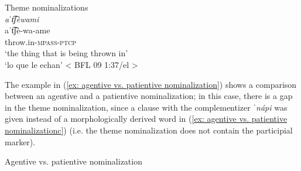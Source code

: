 \ea\label{ex: theme nominalizations}
{Theme nominalizations}\\

    \textit{aˈt͡ʃèwami}\\
    \gll    aˈt͡ʃè-wa-ame\\
            throw.in-\textsc{mpass-ptcp}\\
    \glt    ‘the thing that is being thrown in’\\
    \glt    ‘lo que le echan’ < BFL 09 1:37/el >  \\
\z


The  example in (\ref{ex: agentive vs. patientive nominalization}) shows a comparison between an agentive and a patientive nominalization; in this case, there is a gap in the theme nominalization, since a clause with the complementizer \textit{ˈnápi} was given instead of a morphologically derived word in (\ref{ex: agentive vs. patientive nominalizationc}) (i.e. the theme nominalization does not contain the participial marker).

\ea\label{ex: agentive vs. patientive nominalization}
{Agentive vs. patientive nominalization}

    \label{ex: agentive vs. patientive nominalizationa}
        \label{ex: agentive vs. patientive nominalizationb}
            \label{ex: agentive vs. patientive nominalizationc}
    \z
\z

